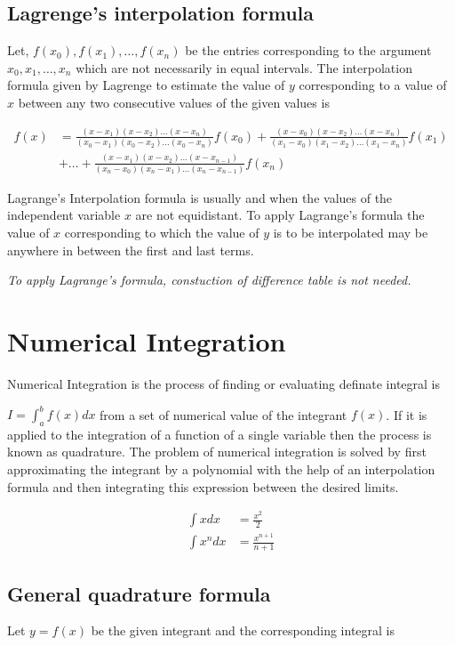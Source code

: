 \documentclass[11pt, a4paper]{article}
\begin{document}
\subsection{Lagrenge's interpolation formula}
Let, $f(x_0),f(x_1),\dots,f(x_n)$ be the entries corresponding to the argument
$x_0,x_1,\dots,x_n$ which are not necessarily in equal intervals. The
interpolation formula given by Lagrenge to estimate the value of $y$
corresponding to a value of $x$ between any two consecutive values of the
given values is

\begin{align*}
  f(x)&=\frac{(x-x_1)(x-x_2)\dots(x-x_n)}{(x_0-x_1)(x_0-x_2)\dots(x_0-x_n)}f(x_0)+\frac{(x-x_0)(x-x_2)\dots(x-x_n)}{(x_1-x_0)(x_1-x_2)\dots(x_1-x_n)}f(x_1)\\
  &+ \dots +\frac{(x-x_1)(x-x_2)\dots(x-x_{n-1})}{(x_n-x_0)(x_n-x_1)\dots(x_n-x_{n-1})}f(x_n)
\end{align*}

Lagrange's Interpolation formula is usually and when the values of the
independent variable $x$ are not equidistant. To apply Lagrange's formula the
value of $x$ corresponding to which the value of $y$ is to be interpolated may
be anywhere in between the first and last terms.

\vskip10pt
\emph{To apply Lagrange's formula, constuction of difference table is not
needed.}%

\section{Numerical Integration}%
Numerical Integration is the process of finding or evaluating definate
integral is 

$I=\int_{a}^{b}f(x)dx$ from a set of numerical value of the integrant $f(x)$.
If it is applied to the integration of a function of a single variable then
the process is known as quadrature. The problem of numerical integration is
solved by first approximating the integrant by a polynomial with the help of
an interpolation formula and then integrating this expression between the
desired limits.

\begin{align*}
  \int xdx&=\frac{x^2}{2}\\
  \int x^ndx&=\frac{x^{n+1}}{n+1}
\end{align*}

\subsection{General quadrature formula}
Let $y=f(x)$ be the given integrant and the corresponding integral is 
\end{document}
